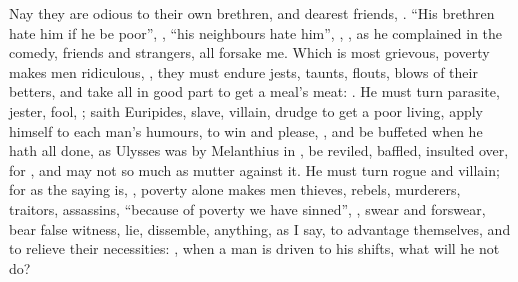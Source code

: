 Nay they are odious to their own brethren, and dearest friends, . \enquote{His brethren hate him if he be poor},
, \enquote{his neighbours hate him}, , , as he
complained in the comedy, friends and strangers, all forsake me. Which is most
grievous, poverty makes men ridiculous, , they must endure
jests, taunts, flouts, blows of their betters, and take
all in good part to get a meal's meat: . He must turn parasite,
jester, fool, ; saith
Euripides, slave, villain, drudge to get a poor living,
apply himself to each man's humours, to win and please, \etc{}, and be buffeted
when he hath all done, as Ulysses was by Melanthius in
\Homer{}, be reviled, baffled, insulted over, for
, and may not so
much as mutter against it. He must turn rogue and villain; for as the saying
is, , poverty alone makes men thieves, rebels,
murderers, traitors, assassins, \enquote{because of poverty we have sinned},
, swear and forswear, bear false witness, lie,
dissemble, anything, as I say, to advantage themselves, and to relieve their
necessities: , when a
man is driven to his shifts, what will he not do?

